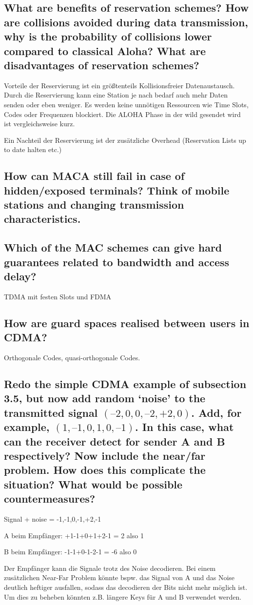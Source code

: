 \subsection{What are benefits of reservation schemes? How are collisions avoided during data
transmission, why is the probability of collisions lower compared to classical Aloha?
What are disadvantages of reservation schemes?}
Vorteile der Reservierung ist ein größtenteils Kollisionsfreier Datenaustausch. Durch die Reservierung kann eine Station je nach bedarf auch mehr Daten senden oder eben weniger. Es werden keine unnötigen Ressourcen wie Time Slots, Codes oder Frequenzen blockiert. Die ALOHA Phase in der wild gesendet wird ist vergleichsweise kurz. 

Ein Nachteil der Reservierung ist der zusätzliche Overhead (Reservation Lists up to date halten etc.)

\subsection{How can MACA still fail in case of hidden/exposed terminals? Think of mobile stations
and changing transmission characteristics.}


\subsection{Which of the MAC schemes can give hard guarantees related to bandwidth and
access delay?} TDMA mit festen Slots und FDMA

\subsection{How are guard spaces realised between users in CDMA?}
Orthogonale Codes, quasi-orthogonale Codes.

\subsection{Redo the simple CDMA example of subsection 3.5, but now add random ‘noise’ to the
transmitted signal $(–2,0,0,–2,+2,0)$. Add, for example, $(1,–1,0,1,0,–1)$. In this case,
what can the receiver detect for sender A and B respectively? Now include the
near/far problem. How does this complicate the situation? What would be possible
countermeasures?}

Signal + noise = -1,-1,0,-1,+2,-1

A beim Empfänger: +1-1+0+1+2-1 = 2 also 1

B beim Empfänger: -1-1+0-1-2-1 = -6 also 0

Der Empfänger kann die Signale trotz des Noise decodieren. Bei einem zusätzlichen Near-Far Problem könnte bspw. das Signal von A und das Noise deutlich heftiger ausfallen, sodass das decodieren der Bits nicht mehr möglich ist. Um dies zu beheben könnten z.B. längere Keys für A und B verwendet werden.
